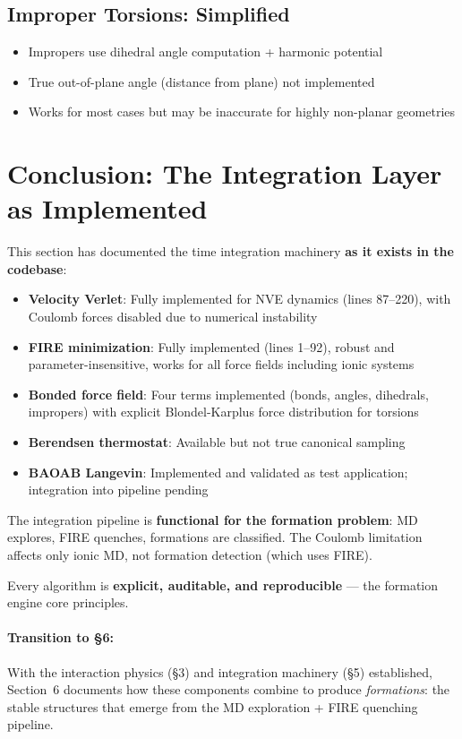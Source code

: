 \documentclass[11pt]{article}
\begin{document}
\subsection{Improper Torsions: Simplified}

\begin{itemize}
\item Impropers use dihedral angle computation + harmonic potential
\item True out-of-plane angle (distance from plane) not implemented
\item Works for most cases but may be inaccurate for highly non-planar geometries
\end{itemize}

\section{Conclusion: The Integration Layer as Implemented}

This section has documented the time integration machinery \textbf{as it exists in the codebase}:

\begin{itemize}
\item \textbf{Velocity Verlet}: Fully implemented for NVE dynamics (lines 87--220), with Coulomb forces disabled due to numerical instability
\item \textbf{FIRE minimization}: Fully implemented (lines 1--92), robust and parameter-insensitive, works for all force fields including ionic systems
\item \textbf{Bonded force field}: Four terms implemented (bonds, angles, dihedrals, impropers) with explicit Blondel-Karplus force distribution for torsions
\item \textbf{Berendsen thermostat}: Available but not true canonical sampling
\item \textbf{BAOAB Langevin}: Implemented and validated as test application; integration into pipeline pending
\end{itemize}

The integration pipeline is \textbf{functional for the formation problem}: MD explores, FIRE quenches, formations are classified. The Coulomb limitation affects only ionic MD, not formation detection (which uses FIRE).

Every algorithm is \textbf{explicit, auditable, and reproducible} --- the formation engine core principles.

\paragraph{Transition to \S6:} With the interaction physics (\S3) and integration machinery (\S5) established, Section~6 documents how these components combine to produce \textit{formations}: the stable structures that emerge from the MD exploration + FIRE quenching pipeline.
\end{document}
